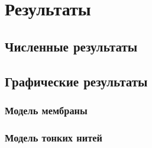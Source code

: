 \chapter{Результаты}\label{ch:results}

\section*{Численные результаты}

\section*{Графические результаты}

\subsection*{Модель мембраны}

\subsection*{Модель тонких нитей}
